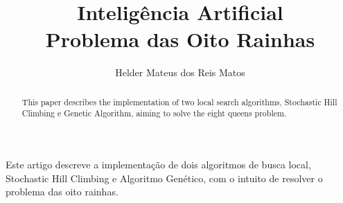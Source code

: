 \documentclass[12pt]{article}
\title{Inteligência Artificial\\Problema das Oito Rainhas}
\author{Helder Mateus dos Reis Matos\inst{1}}
\begin{document}
 

\maketitle

\begin{abstract}
	This paper describes the implementation of two local search algorithms, Stochastic Hill Climbing e Genetic Algorithm, aiming to solve the eight queens problem.
\end{abstract}
     
\begin{resumo} 
	Este artigo descreve a implementação de dois algoritmos de busca local, Stochastic Hill Climbing e Algoritmo Genético, com o intuito de resolver o problema das oito rainhas. 
\end{resumo}






\end{document}
